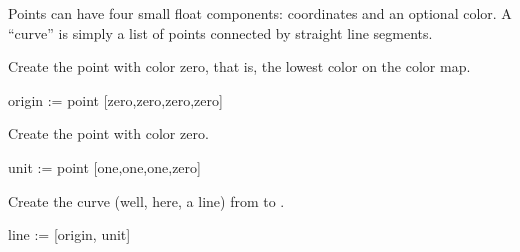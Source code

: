 Points can have four small float components:  coordinates and an
optional color.
A ``curve'' is simply a list of points connected by straight line
segments.
\begin{xtc}
\begin{xtccomment}
Create the point  with color zero, that is, the lowest color
on the color map.
\end{xtccomment}
\begin{spadsrc}
origin := point [zero,zero,zero,zero] 
\end{spadsrc}
\begin{TeXOutput}
\begin{fricasmath}{3}
%
\end{fricasmath}
\end{TeXOutput}
\end{xtc}
\begin{xtc}
\begin{xtccomment}
Create the point  with color zero.
\end{xtccomment}
\begin{spadsrc}
unit := point [one,one,one,zero] 
\end{spadsrc}
\begin{TeXOutput}
\begin{fricasmath}{4}
%
\end{fricasmath}
\end{TeXOutput}
\end{xtc}
\begin{xtc}
\begin{xtccomment}
Create the curve (well, here, a line) from
 to .
\end{xtccomment}
\begin{spadsrc}
line := [origin, unit] 
\end{spadsrc}
\begin{TeXOutput}
\begin{fricasmath}{5}
%
\end{fricasmath}
\end{TeXOutput}
\end{xtc}


